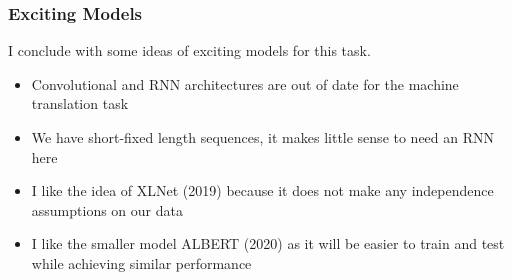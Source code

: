\documentclass{beamer}
\begin{document}
\begin{frame}
  \frametitle{Exciting Models}

  I conclude with some ideas of exciting models for this task.

  \begin{itemize}
  \item Convolutional and RNN architectures are out of date for the
    machine translation task
  \item We have short-fixed length sequences, it makes little sense to
    need an RNN here
  \item I like the idea of XLNet (2019) because it does not make any
    independence assumptions on our data
  \item I like the smaller model ALBERT (2020) as it will be easier to
    train and test while achieving similar performance
  \end{itemize}
\end{frame}
\end{document}
